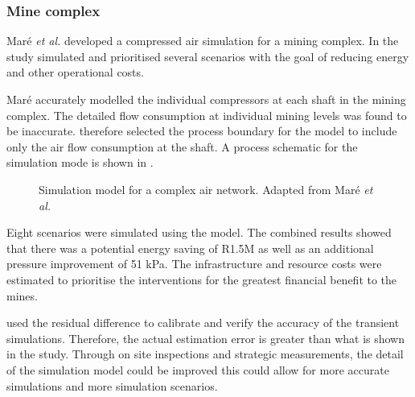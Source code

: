 \subsubsection{Mine complex}
Maré \textit{et al.} \cite{Mare2017Evaluating} developed a compressed air simulation for a mining complex. In the study \cite{Mare2017Evaluating} simulated and prioritised several scenarios with the goal of reducing energy and other operational costs. 
\par
 Maré accurately modelled the individual compressors at each shaft in the mining complex. The detailed flow consumption at individual mining levels was found to be inaccurate. \cite{Mare2017Evaluating} therefore selected the process boundary for the model to include only the air flow consumption at the shaft. A process schematic for the simulation mode is shown in .
 
 \begin{figure}[h!]
 	\centering
 	\caption[Simulation model for a complex air network]{Simulation model for a complex air network. Adapted from Maré \textit{et al.} \cite{Mare2017Evaluating}}
 	\label{fig:Mare model}
 \end{figure}
\par 
 Eight scenarios were simulated using the model. The combined results showed that there was a potential energy saving of R1.5M as well as an additional pressure improvement of 51 kPa. The infrastructure and resource costs were estimated to prioritise the interventions for the greatest financial benefit to the mines.	
\par
	\cite{Mare2017Evaluating} used the residual difference to calibrate and verify the accuracy of the transient simulations. Therefore, the actual estimation error is greater than what is shown in the study. Through on site inspections and strategic measurements, the detail of the simulation model could be improved this could allow for more accurate simulations and more simulation scenarios.
